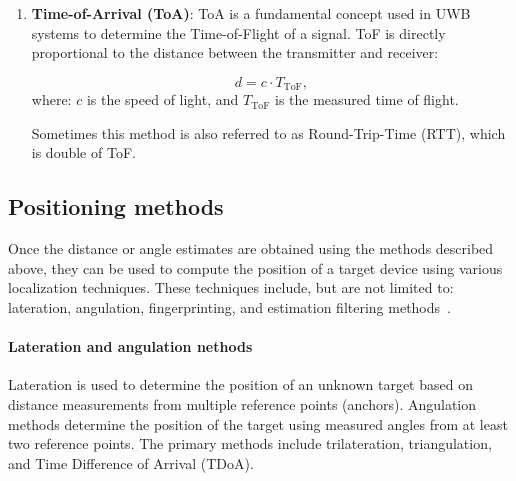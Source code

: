 \begin{enumerate}
    \item \textbf{Time-of-Arrival (ToA)}: ToA is a fundamental concept used in UWB systems to determine the Time-of-Flight of a signal. ToF is directly proportional to the distance between the transmitter and receiver:
    
    \begin{equation}
    d = c \cdot T_{\text{ToF}},
    \end{equation}
    where: $c$ is the speed of light, and $T_{\text{ToF}}$ is the measured time of flight.
    
    Sometimes this method is also referred to as Round-Trip-Time (RTT), which is double of ToF.
\end{enumerate}

\subsection{Positioning methods}
Once the distance or angle estimates are obtained using the methods described above, they can be used to compute the position of a target device using various localization techniques. These techniques include, but are not limited to: lateration, angulation, fingerprinting, and estimation filtering methods~\cite{qi2024current}.

\paragraph{Lateration and angulation nethods}
Lateration is used to determine the position of an unknown target based on distance measurements from multiple reference points (anchors). Angulation methods determine the position of the target using measured angles from at least two reference points.
The primary methods include trilateration, triangulation, and Time Difference of Arrival (TDoA).

